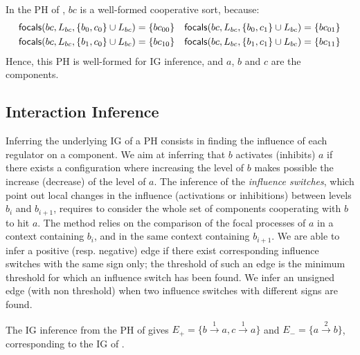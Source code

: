 \begin{example*}
In the PH of , $bc$ is a well-formed cooperative sort, because:
\begin{align*}
\mathsf{focals}(bc, L_{bc}, \{b_0, c_0\} \cup L_{bc}) = \{bc_{00}\} && \mathsf{focals}(bc, L_{bc}, \{b_0, c_1\} \cup L_{bc}) = \{bc_{01}\} \\
\mathsf{focals}(bc, L_{bc}, \{b_1, c_0\} \cup L_{bc}) = \{bc_{10}\} && \mathsf{focals}(bc, L_{bc}, \{b_1, c_1\} \cup L_{bc}) = \{bc_{11}\}
\end{align*}
Hence, this PH is well-formed for IG inference, and $a$, $b$ and $c$ are the components.
\end{example*}



\subsection{Interaction Inference}\label{ssec:infer-IG}

Inferring the underlying IG of a PH consists in finding the influence of each regulator on a component.
We aim at inferring that $b$ activates (inhibits) $a$ if there exists a configuration where increasing the level of $b$ makes possible the increase (decrease) of the level of $a$.
The inference of the \emph{influence switches}, which point out local changes in the influence (activations or inhibitions) between levels $b_i$ and $b_{i+1}$, requires to consider the whole set of components cooperating with $b$ to hit $a$.
The method relies on the comparison of the focal processes of $a$ in a context containing $b_i$, and in the same context containing $b_{i+1}$.
We are able to infer a positive (resp. negative) edge if there exist corresponding influence switches with the same sign only; the threshold of such an edge is the minimum threshold for which an influence switch has been found.
We infer an unsigned edge (with non threshold) when two influence switches with different signs are found.

\begin{example*}
The IG inference from the PH of  gives
$E_+ = \{b \xrightarrow{1} a, c \xrightarrow{1} a\}$ and
$E_- = \{a \xrightarrow{2} b\}$, corresponding to the IG of .
\end{example*}

